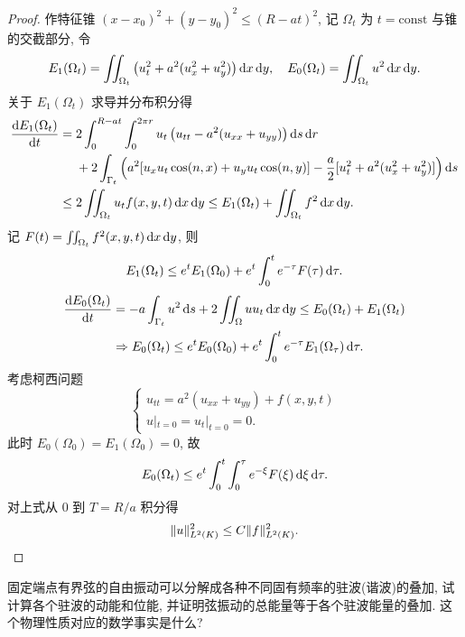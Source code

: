 \begin{proof}
  作特征锥 $(x-x_0)^2+(y-y_0)^2\leq (R-at)^2$,
  记 $\Omega_t$ 为 $t=\text{const}$ 与锥的交截部分, 令
  \[E_1(\Omega_t)=\iint_{\Omega_t}\left(u_t^2+a^2(u_x^2+u_y^2)\right)\mathop{}\!\mathrm{d} x\mathop{}\!\mathrm{d} y,
    \quad E_0(\Omega_t)=\iint_{\Omega_t}u^2\mathop{}\!\mathrm{d} x\mathop{}\!\mathrm{d} y.\]
  关于 $E_1(\Omega_t)$ 求导并分布积分得
  \begin{align*}
    \frac{\diff E_1(\Omega_t)}{\diff t}
    ={} & 2\int_0^{R-at}\int_0^{2\pi r} u_t\left(u_{tt}-a^2(u_{xx}+u_{yy})\right)
          \diff s\diff r \\
        & + 2\int_{\Gamma_t} \left(a^2[u_xu_t\cos(n,x)+u_yu_t\cos(n,y)]
          - \frac{a}{2}[u_t^2+a^2(u_x^2+u_y^2)]\right)\diff s \\
    \leq{} & 2\iint_{\Omega_t} u_t f(x,y,t)\diff x\diff y
          \leq E_1(\Omega_t) + \iint_{\Omega_t} f^2 \diff x\diff y.
  \end{align*}
  记 $F(t)=\iint_{\Omega_t} f^2(x,y,t) \mathop{}\!\mathrm{d} x\mathop{}\!\mathrm{d} y$, 则
  \[E_1(\Omega_t) \leq e^t E_1(\Omega_0) + e^t \int_0^te^{-\tau}F(\tau)\mathop{}\!\mathrm{d}\tau.\]
  \[\begin{split}
    \frac{\mathop{}\!\mathrm{d} E_0(\Omega_t)}{\mathop{}\!\mathrm{d} t}
    & = -a\int_{\Gamma_t}u^2\mathop{}\!\mathrm{d} s+2\iint_{\Omega}uu_t\mathop{}\!\mathrm{d} x\mathop{}\!\mathrm{d} y\leq E_0(\Omega_t)
      + E_1(\Omega_t) \\
    & \Rightarrow E_0(\Omega_t)\leq e^tE_0(\Omega_0)
      + e^t\int_0^te^{-\tau}E_1(\Omega_{\tau})\mathop{}\!\mathrm{d}\tau.
  \end{split}\]
  考虑柯西问题
  \[\begin{cases}
    u_{tt} = a^2(u_{xx}+u_{yy})+f(x,y,t) \\
    u|_{t=0} = u_t|_{t=0} = 0.
  \end{cases}\]
  此时 $E_0(\Omega_0) = E_1(\Omega_0) = 0$, 故
  \[E_0(\Omega_t)\leq e^t\int_0^t \int_0^{\tau} e^{-\xi}F(\xi) \mathop{}\!\mathrm{d}\xi\mathop{}\!\mathrm{d}\tau.\]
  对上式从 $0$ 到 $T=R/a$ 积分得
  \[\|u\|_{L^2(K)}^2\leq C\|f\|_{L^2(K)}^2.\qedhere\]
\end{proof}


\begin{exercise}
  固定端点有界弦的自由振动可以分解成各种不同固有频率的驻波(谐波)的叠加,
  试计算各个驻波的动能和位能, 并证明弦振动的总能量等于各个驻波能量的叠加.
  这个物理性质对应的数学事实是什么?
\end{exercise}


